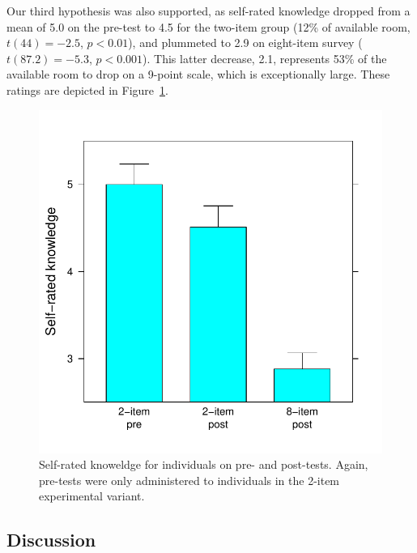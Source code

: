 Our third hypothesis was also supported, as self-rated knowledge dropped from a
mean of 5.0 on the pre-test to 4.5 for the two-item group (12\% of available
room, $t(44)=-2.5$, $p<0.01$), and plummeted to 2.9 on eight-item survey
($t(87.2)=-5.3$, $p<0.001$). This latter decrease, 2.1, represents 53\% of the
available room to drop on a 9-point scale, which is exceptionally large. These
ratings are depicted in Figure~\ref{fig:evil-know}.

\begin{figure}
    \centering
    \includegraphics{evil-know.pdf}
    \caption{Self-rated knoweldge for individuals on pre- and post-tests. Again,
        pre-tests were only administered to individuals in the 2-item
        experimental variant.}
    \label{fig:evil-know}
\end{figure}

\subsection{Discussion}

